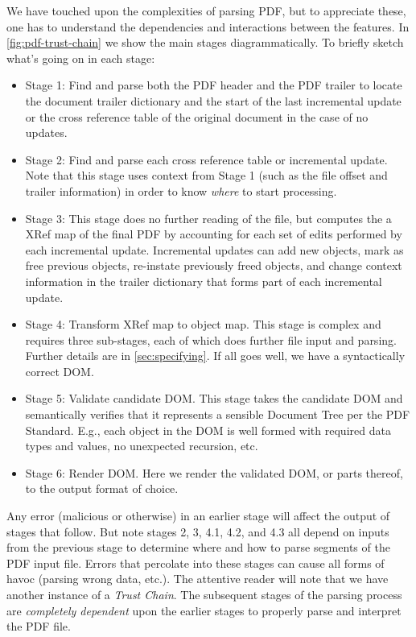 We have touched upon the complexities of parsing
PDF, but to appreciate these, one has to understand the
dependencies and interactions between the features.
In \cref{fig:pdf-trust-chain} we show the main stages diagrammatically.
To briefly sketch what's going on in each stage:
\begin{itemize}
\item Stage 1: Find and parse both the PDF header and the PDF trailer to locate
  the document trailer dictionary and the start of the last incremental update or
  the cross reference table of the original document in the case of no updates.
\item Stage 2: Find and parse each cross reference table or incremental update. 
  Note that this stage uses context from Stage 1 (such as the file offset and trailer
  information) in order to know  \emph{where} to start processing.
\item Stage 3: This stage does no further reading of the file, but computes the
   a XRef map of the final PDF by accounting for each set of edits performed by each incremental update.
   Incremental updates can add new objects, mark as free previous objects, re-instate previously 
   freed objects, and change context information in the trailer dictionary that 
   forms part of each incremental update.
\item Stage 4: Transform XRef map to object map. This stage is complex and
  requires three sub-stages, each of which does further file input and parsing.
  Further details are in \cref{sec:specifying}.
  If all goes well, we have a syntactically correct DOM.
\item Stage 5: Validate candidate DOM.  This stage takes the candidate DOM and
  semantically verifies that it represents a sensible Document Tree per the PDF Standard.
  E.g., each object in the DOM is well formed with required data types and values, 
  no unexpected recursion, etc.
\item Stage 6: Render DOM.  Here we render the validated DOM, or parts thereof,
  to the output format of choice.
\end{itemize}

Any error (malicious or otherwise) in an earlier stage will affect the output of stages that follow.
But note stages 2, 3, 4.1, 4.2, and 4.3 all depend on inputs from the previous stage to determine 
where and how to parse segments of the PDF input file.
Errors that percolate into these stages can
cause all forms of havoc (parsing wrong data, etc.).
%
The attentive reader will note that we have another instance of a \emph{Trust
Chain}.  The subsequent stages of the parsing process are \emph{completely
dependent} upon the earlier stages to properly parse and interpret the PDF
file.

